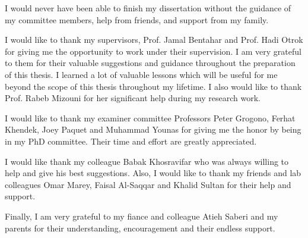 I would never have been able to finish my dissertation without the guidance of my committee members, help from friends, and support from my family.

I would like to thank my supervisors, Prof. Jamal Bentahar and Prof. Hadi Otrok for giving me the opportunity to work under their supervision. I am very grateful to them for their valuable suggestions and guidance throughout the preparation of this thesis. I learned a lot of valuable lessons which will be useful for me beyond the scope of this thesis throughout my lifetime. I also would like to thank Prof. Rabeb Mizouni for her significant help during my research work.

I would like to thank my examiner committee Professors Peter Grogono, Ferhat Khendek, Joey Paquet and Muhammad Younas for giving me the honor by being in my PhD committee. Their time and effort are greatly appreciated.

I would like thank my colleague Babak Khosravifar who was always willing to help and give his best suggestions. Also, I would like to thank my friends and lab colleagues Omar Marey, Faisal Al-Saqqar and Khalid Sultan for their help and support.

Finally, I am very grateful to my fiance and colleague Atieh Saberi and my parents for their understanding, encouragement and their endless support.
